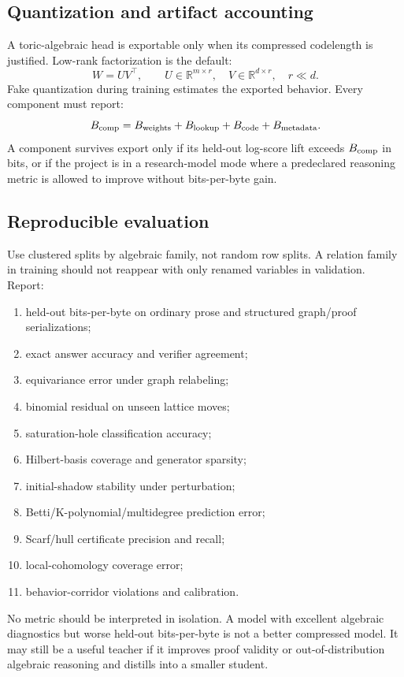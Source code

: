 \documentclass[11pt]{article}
\theoremstyle{definition}
\newcommand{\RR}{\mathbb{R}}
\begin{document}
\subsection{Quantization and artifact accounting}
A toric-algebraic head is exportable only when its compressed codelength is justified.  Low-rank factorization is the default:
\[
W=UV^\top,
\qquad U\in\RR^{m\times r},\quad V\in\RR^{d\times r},\quad r\ll d.
\]
Fake quantization during training estimates the exported behavior.  Every component must report:
\[
B_{\rm comp}=B_{\rm weights}+B_{\rm lookup}+B_{\rm code}+B_{\rm metadata}.
\]
A component survives export only if its held-out log-score lift exceeds \(B_{\rm comp}\) in bits, or if the project is in a research-model mode where a predeclared reasoning metric is allowed to improve without bits-per-byte gain.

\subsection{Reproducible evaluation}
Use clustered splits by algebraic family, not random row splits.  A relation family in training should not reappear with only renamed variables in validation.  Report:
\begin{enumerate}[leftmargin=*]
\item held-out bits-per-byte on ordinary prose and structured graph/proof serializations;
\item exact answer accuracy and verifier agreement;
\item equivariance error under graph relabeling;
\item binomial residual on unseen lattice moves;
\item saturation-hole classification accuracy;
\item Hilbert-basis coverage and generator sparsity;
\item initial-shadow stability under perturbation;
\item Betti/K-polynomial/multidegree prediction error;
\item Scarf/hull certificate precision and recall;
\item local-cohomology coverage error;
\item behavior-corridor violations and calibration.
\end{enumerate}
No metric should be interpreted in isolation.  A model with excellent algebraic diagnostics but worse held-out bits-per-byte is not a better compressed model.  It may still be a useful teacher if it improves proof validity or out-of-distribution algebraic reasoning and distills into a smaller student.
\end{document}
